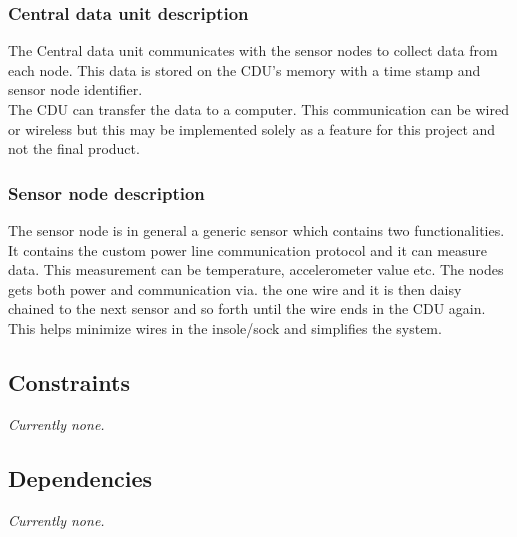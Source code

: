 \subsubsection{Central data unit description}
The Central data unit communicates with the sensor nodes to collect data from each node. This data is stored on the CDU's memory with a time stamp and sensor node identifier.\\
The CDU can transfer the data to a computer. This communication can be wired or wireless but this may be implemented solely as a feature for this project and not the final product.

\subsubsection{Sensor node description}
The sensor node is in general a generic sensor which contains two functionalities. It contains the custom power line communication protocol and it can measure data. This measurement can be temperature, accelerometer value etc. The nodes gets both power and communication via. the one wire and it is then daisy chained to the next sensor and so forth until the wire ends in the CDU again. This helps minimize wires in the insole/sock and simplifies the system. 

\subsection{Constraints}
\textit{Currently none.}
\subsection{Dependencies}
\textit{Currently none.}



